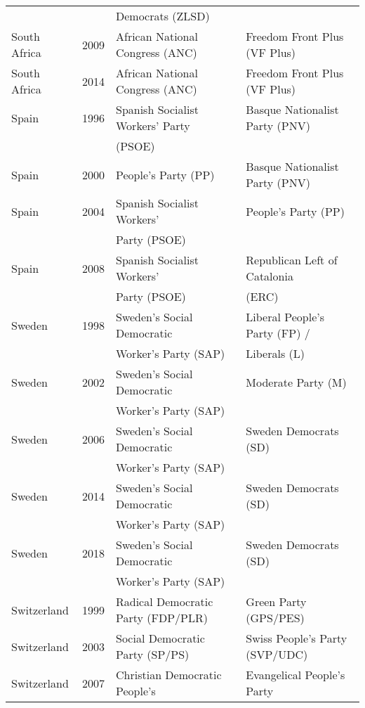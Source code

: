 {\begin{longtable}{|l|c|l|l|}
               &      &     Democrats (ZLSD)    &     \\ 
   South Africa & 2009 &   African National Congress (ANC)   &   Freedom Front Plus (VF Plus) \\ 
   South Africa & 2014 &   African National Congress (ANC)   &   Freedom Front Plus (VF Plus) \\ 
   Spain & 1996 &   Spanish Socialist Workers' Party  &   Basque Nationalist Party (PNV)   \\ 
               &      &     (PSOE)  &     \\ 
   Spain & 2000 &   People's Party (PP) &   Basque Nationalist Party (PNV)   \\ 
   Spain & 2004 &   Spanish Socialist Workers' &   People's Party (PP) \\ 
               &      &     Party (PSOE)     &     \\ 
  Spain & 2008 &   Spanish Socialist Workers'  &   Republican Left of Catalonia  \\ 
               &      &       Party (PSOE)  &    (ERC) \\ 
   Sweden & 1998 &   Sweden's   Social Democratic &   Liberal People's Party (FP) /  \\ 
               &      &  Worker's Party (SAP)      &    Liberals (L)   \\ 
   Sweden & 2002 &   Sweden's   Social Democratic  &   Moderate Party (M) \\ 
               &      &      Worker's Party (SAP)  &     \\ 
   Sweden & 2006 &   Sweden's   Social Democratic  &   Sweden Democrats (SD) \\ 
               &      &   Worker's Party (SAP)     &     \\ 
   Sweden & 2014 &   Sweden's   Social Democratic  &   Sweden Democrats (SD) \\ 
               &      &   Worker's Party (SAP)     &     \\ 
   Sweden & 2018 &   Sweden's   Social Democratic  &   Sweden Democrats (SD) \\ 
               &      &     Worker's Party (SAP)   &     \\ 
   Switzerland & 1999 &   Radical Democratic Party (FDP/PLR) &   Green Party (GPS/PES) \\ 
   Switzerland & 2003 &        Social Democratic Party (SP/PS)  &   Swiss People's Party  (SVP/UDC)  \\ 
   Switzerland & 2007 &   Christian Democratic People's  &   Evangelical People's Party  \\ 

\end{longtable}}

